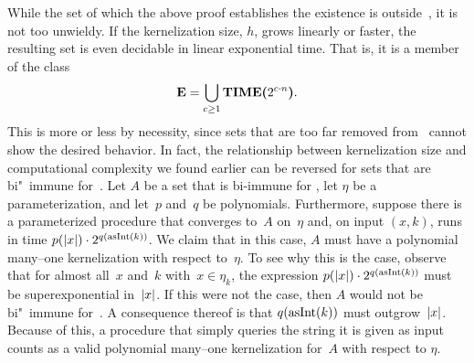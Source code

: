 While the set of which the above proof establishes the existence is outside~, it is not too unwieldy.
If the kernelization size, $h$, grows linearly or faster, the resulting set is even decidable in linear exponential time.
That is, it is a member of the class
\begin{equation*}
  \textnormal{\textbf{E}} = \bigcup_{c \ge 1} \textnormal{\textbf{TIME($2^{c \cdot n}$)}}.
\end{equation*}
This is more or less by necessity, since sets that are too far removed from~ cannot show the desired behavior.
In fact, the relationship between kernelization size and computational complexity we found earlier can be reversed for sets that are bi"~immune for~.
Let $A$ be a set that is bi-immune for , let $\eta$ be a parameterization, and let~$p$ and~$q$ be polynomials.
Furthermore, suppose there is a parameterized procedure that converges to~$A$ on~$\eta$ and, on input $(x, k)$, runs in time $p({\lvert x\rvert}) \cdot 2^{q(\operatorname{asInt}(k))}$.
We claim that in this case, $A$ must have a polynomial many--one kernelization with respect to~$\eta$.
To see why this is the case, observe that for almost all~$x$ and~$k$ with~$x \in \eta_k$, the expression $p({\lvert x\rvert}) \cdot 2^{q(\operatorname{asInt}(k))}$ must be superexponential in~${\lvert x\rvert}$.
If this were not the case, then $A$ would not be bi"~immune for~.
A consequence thereof is that $q(\operatorname{asInt}(k))$ must outgrow~${\lvert x\rvert}$.
Because of this, a procedure that simply queries the string it is given as input counts as a valid polynomial many--one kernelization for~$A$ with respect to $\eta$.

